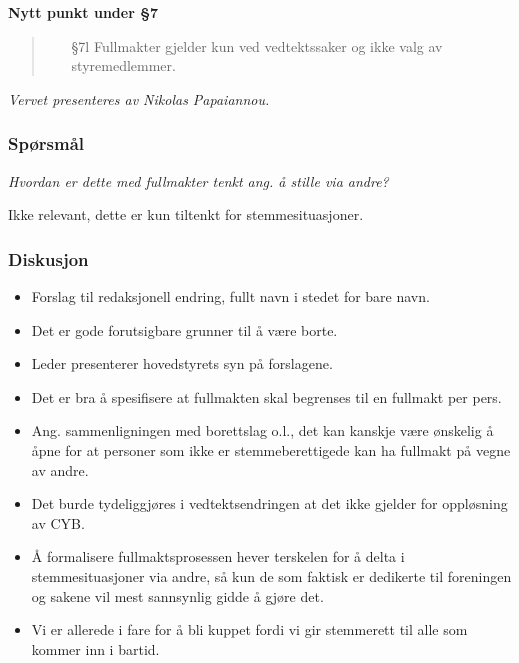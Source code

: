 \documentclass[10pt,norsk,a4paper]{article}
\begin{document}
\textbf{Nytt punkt under §7}
\begin{quote}
    \begin{enumerate}
        \item[§7l] Fullmakter gjelder kun ved vedtektssaker og ikke valg av styremedlemmer.
    \end{enumerate}
\end{quote}

\textit{Vervet presenteres av Nikolas Papaiannou.}

\subsubsection{Spørsmål}
\emph{Hvordan er dette med fullmakter tenkt ang. å stille via andre?}

Ikke relevant, dette er kun tiltenkt for stemmesituasjoner.

\subsubsection{Diskusjon}
\begin{itemize}
	\item Forslag til redaksjonell endring, fullt navn i stedet for bare navn.
	\item Det er gode forutsigbare grunner til å være borte.
	\item Leder presenterer hovedstyrets syn på forslagene.
	\item Det er bra å spesifisere at fullmakten skal begrenses til en fullmakt per pers.
	\item Ang. sammenligningen med borettslag o.l., det kan kanskje være ønskelig å åpne for at personer som ikke er stemmeberettigede kan ha fullmakt på vegne av andre. 
	\item Det burde tydeliggjøres i vedtektsendringen at det ikke gjelder for oppløsning av CYB.
	\item Å formalisere fullmaktsprosessen hever terskelen for å delta i stemmesituasjoner via andre, så kun de som faktisk er dedikerte til foreningen og sakene vil mest sannsynlig gidde å gjøre det. 
	\item Vi er allerede i fare for å bli kuppet fordi vi gir stemmerett til alle som kommer inn i bartid.
\end{itemize}	
\end{document}

